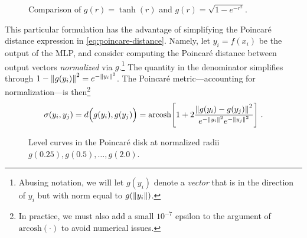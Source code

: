 \documentclass{article}
\begin{document}
\begin{figure}[h]
  \centering
  \caption{Comparison of $g(r) = \tanh(r)$ and $g(r) = \sqrt{1 - e^{-r^2}}$.}
  \label{fig:radial-transformations}
\end{figure}

This particular formulation has the advantage of simplifying the Poincaré distance expression in \eqref{eq:poincare-distance}. Namely, let $y_i = f(x_i)$ be the output of the MLP, and consider computing the Poincaré distance between output vectors \emph{normalized} via $g$.\footnote{Abusing notation, we will let $g(y_i)$ denote a \emph{vector} that is in the direction of $y_i$ but with norm equal to $g(\norm{y_i})$.} The quantity in the denominator simplifies through $1 - \norm{g(y_i)}^2 = e^{-\norm{y_i}^2}$. The Poincaré metric---accounting for normalization---is then\footnote{In practice, we must also add a small $10^{-7}$ epsilon to the argument of $\text{arcosh}(\cdot)$ to avoid numerical issues.}
\begin{align}
  \sigma(y_i, y_j)
  = d \Big( g(y_i), g(y_j) \Big)
  = \text{arcosh} \qty[1 + 2 \frac{\norm{g(y_i) - g(y_j)}^2}{e^{-\norm{y_i}^2} e^{-\norm{y_j}^2}}] \; .
\end{align}

\begin{figure}[h]
  \centering
  \caption{Level curves in the Poincaré disk at normalized radii $g(0.25), g(0.5), \dots, g(2.0)$.}
  \label{fig:poincare-level-curves}
\end{figure}
\end{document}
